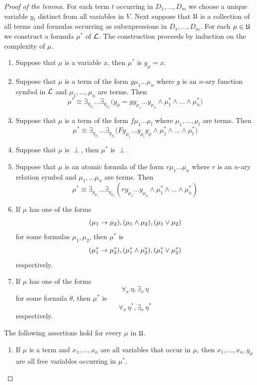 \documentclass[10pt]{amsart}
\begin{document}
\begin{proof}[Proof of the lemma]
	For each term $t$ occurring in $D_1,...,D_m$ we choose a unique variable $y_t$ distinct from all variables in $V$. Next suppose that ${\mathfrak U}$ is a collection of all terms and formulas occurring as subexpressions in $D_1,...,D_m$. For each $\mu \in {\mathfrak U}$ we construct a formula $\mu^*$ of ${\mathcal L}$. The construction proceeds by induction on the complexity of $\mu$.
	\begin{enumerate}[label=\textbf{(\arabic*)}, leftmargin=3.0em]
		\item Suppose that $\mu$ is a variable $x$, then $\mu^*$ is $y_{\mu} = x$.
		\item Suppose that $\mu$ is a term of the form $g\mu_1...\mu_n$ where $g$ is an $n$-ary function symbol in ${\mathcal L}$ and $\mu_1,...,\mu_n$ are terms. Then
		      $$\mu^* \equiv \exists_{y_{\mu_1}}...\exists_{y_{\mu_n}}\big(y_\mu = gy_{\mu_1}...y_{\mu_n} \wedge \mu_1^* \wedge ... \wedge \mu_n^*\big)$$
		\item Suppose that $\mu$ is a term of the form $f\mu_1...\mu_l$ where $\mu_1,...,\mu_l$ are terms. Then
		      $$\mu^* \equiv  \exists_{y_{\mu_1}}...\exists_{y_{\mu_l}}\big(Fy_{\mu_1}...y_{\mu_l}y_\mu \wedge \mu_1^* \wedge ... \wedge \mu_l^*\big)$$
		\item Suppose that $\mu$ is $\perp$, then $\mu^*$ is $\perp$.
		\item Suppose that $\mu$ is an atomic formula of the form $r\mu_1...\mu_n$ where $r$ is an $n$-ary relation symbol and $\mu_1,...\mu_n$ are terms. Then
      $$\mu^* \equiv \exists_{y_{\mu_1}}...\exists_{y_{\mu_n}}\left(ry_{\mu_1}...y_{\mu_n} \wedge \mu_1^*\wedge ... \wedge \mu_n^*\right)$$
		\item If $\mu$ has one of the forms
		      $$(\mu_1 \rightarrow \mu_2), (\mu_1 \wedge \mu_2), (\mu_1 \vee \mu_2)$$
		      for some formulas $\mu_1,\mu_2$, then $\mu^*$ is
		      $$(\mu_1^* \rightarrow \mu_2^*), (\mu_1^* \wedge \mu_2^{*}), (\mu_1^{*} \vee \mu_2^{*})$$
          respectively.
		\item If $\mu$ has one of the forms 
      $$\forall_x\,\eta, \exists_x\,\eta$$
      for some formula $\theta$, then $\mu^*$ is
		  $$\forall_x\,\eta^*, \exists_x\,\eta^*$$
      respectively.
	\end{enumerate}
The following assertions hold for every $\mu$ in ${\mathfrak U}$.
	\begin{enumerate}[label=Fact \arabic*.]
    \item If $\mu$ is a term and $x_1,...,x_n$ are all variables that occur in $\mu$, then $x_1,...,x_n,y_{\mu}$ are all free variables occurring in $\mu^*$.

\end{enumerate}
\end{proof}
\end{document}
